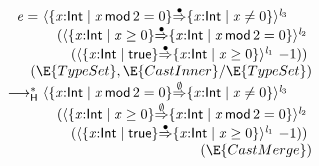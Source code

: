 \documentclass[9pt]{extarticle}
\newcommand{\ottnt}[1]{\mathit{#1}}
\newcommand{\ottsym}[1]{#1}
\begin{document}
{\begin{figure}[t]
\[ \begin{array}{r@{~}l}
  \ottnt{e} = &  \langle   \{ \mathit{x} \mathord{:}  \mathsf{Int}  \mathrel{\mid}  \mathit{x} \,  \mathsf{mod}  \, \ottsym{2}  \mathrel{=}  \ottsym{0}  \}   \mathord{ \overset{\bullet}{\Rightarrow} }   \{ \mathit{x} \mathord{:}  \mathsf{Int}  \mathrel{\mid}  \mathit{x}  \mathrel{\ne}  \ottsym{0}  \}   \rangle^{ \ottnt{l_{{\mathrm{3}}}} } ~  {} \\  &  \quad   (  \langle   \{ \mathit{x} \mathord{:}  \mathsf{Int}  \mathrel{\mid}  \mathit{x}  \mathrel{\ge}  \ottsym{0}  \}   \mathord{ \overset{\bullet}{\Rightarrow} }   \{ \mathit{x} \mathord{:}  \mathsf{Int}  \mathrel{\mid}  \mathit{x} \,  \mathsf{mod}  \, \ottsym{2}  \mathrel{=}  \ottsym{0}  \}   \rangle^{ \ottnt{l_{{\mathrm{2}}}} } ~  {} \\  &  \qquad   (  \langle   \{ \mathit{x} \mathord{:}  \mathsf{Int}  \mathrel{\mid}  \mathsf{true}  \}   \mathord{ \overset{\bullet}{\Rightarrow} }   \{ \mathit{x} \mathord{:}  \mathsf{Int}  \mathrel{\mid}  \mathit{x}  \mathrel{\ge}  \ottsym{0}  \}   \rangle^{ \ottnt{l_{{\mathrm{1}}}} } ~   {-1}   )   )   \\
 \multicolumn{2}{r}{(\E{TypeSet}, \E{CastInner}/\E{TypeSet})} \\
  \longrightarrow ^{*}_{  \mathsf{H}  }  &  \langle   \{ \mathit{x} \mathord{:}  \mathsf{Int}  \mathrel{\mid}  \mathit{x} \,  \mathsf{mod}  \, \ottsym{2}  \mathrel{=}  \ottsym{0}  \}   \mathord{ \overset{ \emptyset }{\Rightarrow} }   \{ \mathit{x} \mathord{:}  \mathsf{Int}  \mathrel{\mid}  \mathit{x}  \mathrel{\ne}  \ottsym{0}  \}   \rangle^{ \ottnt{l_{{\mathrm{3}}}} } ~  {} \\  &  \quad   (  \langle   \{ \mathit{x} \mathord{:}  \mathsf{Int}  \mathrel{\mid}  \mathit{x}  \mathrel{\ge}  \ottsym{0}  \}   \mathord{ \overset{ \emptyset }{\Rightarrow} }   \{ \mathit{x} \mathord{:}  \mathsf{Int}  \mathrel{\mid}  \mathit{x} \,  \mathsf{mod}  \, \ottsym{2}  \mathrel{=}  \ottsym{0}  \}   \rangle^{ \ottnt{l_{{\mathrm{2}}}} } ~  {} \\  &  \qquad   (  \langle   \{ \mathit{x} \mathord{:}  \mathsf{Int}  \mathrel{\mid}  \mathsf{true}  \}   \mathord{ \overset{\bullet}{\Rightarrow} }   \{ \mathit{x} \mathord{:}  \mathsf{Int}  \mathrel{\mid}  \mathit{x}  \mathrel{\ge}  \ottsym{0}  \}   \rangle^{ \ottnt{l_{{\mathrm{1}}}} } ~   {-1}   )   )   \\
 \multicolumn{2}{r}{(\E{CastMerge})} \\ 

\end{array}\]
\end{figure}}
\end{document}
